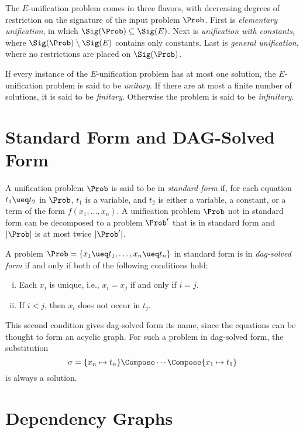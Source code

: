 The $E$-unification problem comes in three flavors, with decreasing degrees of
restriction on the signature of the input problem $\Prob$. First is
\emph{elementary unification}, in which $\Sig(\Prob) \subseteq \Sig(E)$. Next
is \emph{unification with constants}, where $\Sig(\Prob) \setminus \Sig(E)$
contains only constants. Last is \emph{general unification}, where no
restrictions are placed on $\Sig(\Prob)$.

If every instance of the $E$-unification problem has at most one solution, the
$E$-unification problem is said to be \emph{unitary}. If there are at most a
finite number of solutions, it is said to be \emph{finitary}. Otherwise the
problem is said to be \emph{infinitary}.

\section{Standard Form and DAG-Solved Form}\label{sec:std-form}

A unification problem $\Prob$ is said to be in \emph{standard form} if, for
each equation $t_1 \ueq t_2$ in $\Prob$, $t_1$ is a variable, and $t_2$ is
either a variable, a constant, or a term of the form $f(x_1, \dotsc, x_n)$. A
unification problem $\Prob$ not in standard form can be decomposed to a problem
$\Prob'$ that is in standard form and $|\Prob|$ is at most twice $|\Prob'|$.

A problem $\Prob = \{ x_1 \ueq t_1, \dotsc, x_n \ueq t_n \}$ in standard form
is in \emph{dag-solved form} if and only if both of the following conditions
hold:

\begin{enumerate}[(i)]
    \item Each $x_i$ is unique, i.e., $x_i = x_j$ if and only if $i = j$.
    \item If $i < j$, then $x_i$ does not occur in $t_j$.
\end{enumerate}

This second condition gives dag-solved form its name, since the equations can
be thought to form an acyclic graph. For such a problem in
dag-solved form, the substitution
\[\sigma = \{ x_n \mapsto t_n \} \Compose \dotsb \Compose \{ x_1 \mapsto t_1 \}\]
is always a solution.

\section{Dependency Graphs}\label{sec:dep-graphs}

